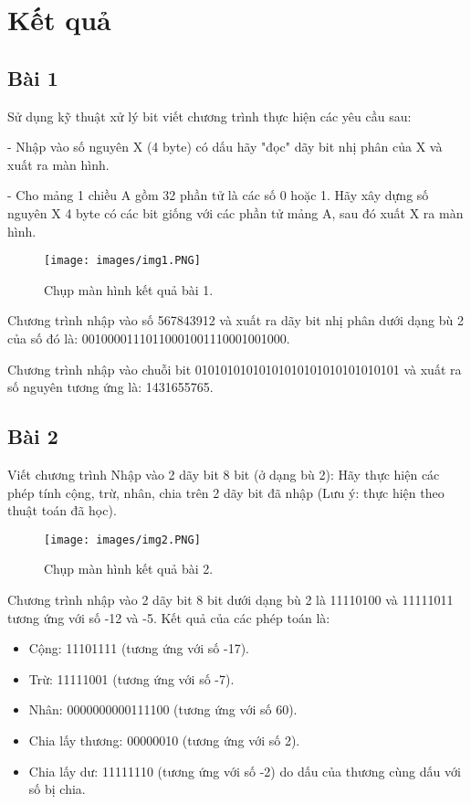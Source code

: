 \section{Kết quả}
\subsection{Bài 1}
Sử dụng kỹ thuật xử lý bit viết chương trình thực hiện các yêu cầu sau:

- Nhập vào số nguyên X (4 byte) có dấu hãy "đọc" dãy bit nhị phân của X và xuất ra màn hình.

- Cho mảng 1 chiều A gồm 32 phần tử là các số 0 hoặc 1. Hãy xây dựng số nguyên X 4 byte có các bit giống với các phần tử mảng A, sau đó xuất X ra màn hình.

\begin{figure}[H]
	\centering
	\texttt{[image: images/img1.PNG]}
	\caption{Chụp màn hình kết quả bài 1.}
\end{figure}

Chương trình nhập vào số 567843912 và xuất ra dãy bit nhị phân dưới dạng bù 2 của số đó là: 00100001110110001001110001001000.

Chương trình nhập vào chuỗi bit 01010101010101010101010101010101 và xuất ra số nguyên tương ứng là: 1431655765.

\subsection{Bài 2}

Viết chương trình Nhập vào 2 dãy bit 8 bit (ở dạng bù 2):
Hãy thực hiện các phép tính cộng, trừ, nhân, chia trên 2 dãy bit đã nhập (Lưu ý: thực hiện theo thuật toán đã học).

\begin{figure}[H]
	\centering
	\texttt{[image: images/img2.PNG]}
	\caption{Chụp màn hình kết quả bài 2.}
\end{figure}

Chương trình nhập vào 2 dãy bit 8 bit dưới dạng bù 2 là 11110100 và 11111011 tương ứng với số -12 và -5. Kết quả của các phép toán là:
\begin{itemize}
	\item Cộng: 11101111 (tương ứng với số -17).
	\item Trừ: 11111001 (tương ứng với số -7).
	\item Nhân: 0000000000111100 (tương ứng với số 60).
	\item Chia lấy thương: 00000010 (tương ứng với số 2).
	\item Chia lấy dư: 11111110 (tương ứng với số -2) do dấu của thương cùng dấu với số bị chia.
\end{itemize}
